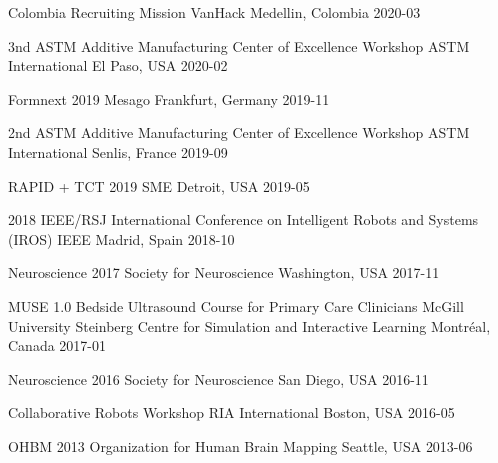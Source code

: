 \begin{cvhonors}

\cvhonor
{Colombia Recruiting Mission}
{VanHack}
{Medellin, Colombia}
{2020-03}

\cvhonor
{3nd ASTM Additive Manufacturing Center of Excellence Workshop}
{ASTM International}
{El Paso, USA}
{2020-02}

\cvhonor
{Formnext 2019}
{Mesago}
{Frankfurt, Germany}
{2019-11}

\cvhonor
{2nd ASTM Additive Manufacturing Center of Excellence Workshop}
{ASTM International}
{Senlis, France}
{2019-09}

\cvhonor
{RAPID + TCT 2019}
{SME}
{Detroit, USA}
{2019-05}

\cvhonor
{2018 IEEE/RSJ International Conference on Intelligent Robots and Systems (IROS)}
{IEEE}
{Madrid, Spain}
{2018-10}

\cvhonor
{Neuroscience 2017}
{Society for Neuroscience}
{Washington, USA}
{2017-11}

\cvhonor
{MUSE 1.0 Bedside Ultrasound Course for Primary Care Clinicians}
{McGill University Steinberg Centre for Simulation and Interactive Learning}
{Montréal, Canada}
{2017-01}

\cvhonor
{Neuroscience 2016}
{Society for Neuroscience}
{San Diego, USA}
{2016-11}

\cvhonor
{Collaborative Robots Workshop}
{RIA International}
{Boston, USA}
{2016-05}

\cvhonor
{OHBM 2013}
{Organization for Human Brain Mapping}
{Seattle, USA}
{2013-06}

\end{cvhonors}
